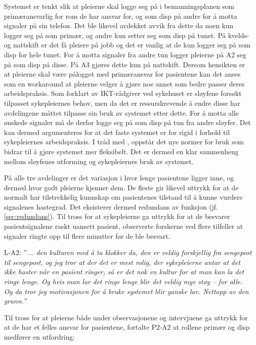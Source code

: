 \noindent
Systemet er tenkt slik at pleierne skal logge seg på i bemanningsplanen som primæransvarlig for rom de har ansvar for, og som disp på andre for å motta signaler på sin telefon. Det ble likevel avdekket avvik fra dette da noen kun logger seg på som primær, og andre kun setter seg som disp på tunet. På kvelds- og nattskift er det få pleiere på jobb og det er vanlig at de kun logger seg på som disp for hele tunet. For å motta signaler fra andre tun logger pleierne på A2 seg på som disp på disse. På A3 gjøres dette kun på nattskift. Dersom hensikten er at pleierne skal være pålogget med primæransvar for pasientene kan det anses som en workaround at pleierne velger å gjøre noe annet som bedre passer deres arbeidspraksis. Som forklart av IKT-rådgiver ved sykehuset er sløyfene forsøkt tilpasset sykepleiernes behov, men da det er ressurskrevende å endre disse har avdelingene måttet tilpasse sin bruk av systemet etter dette. For å motta alle ønskede signaler må de derfor logge seg på som disp på tun fra andre sløyfer. Det kan dermed argumenteres for at det faste systemet er for rigid i forhold til sykepleiernes arbeidspraksis. I tråd med \citep{Ackermann00}, oppstår det nye normer for bruk som bidrar til å gjøre systemet mer fleksibelt. Det er dermed en klar sammenheng mellom sløyfenes utforming og sykepleiernes bruk av systemet.

\noindent
På alle tre avdelinger er det variasjon i hvor lenge pasientene ligger inne, og dermed hvor godt pleierne kjenner dem. De fleste gir likevel uttrykk for at de normalt har tilstrekkelig kunnskap om pasientenes tilstand til å kunne vurdere signalenes hastegrad. Det eksisterer dermed redundans av funksjon (jf. \ref{sec:redundans}). Til tross for at sykepleierne ga uttrykk for at de besvarer pasientsignalene raskt uansett pasient, observerte forskerne ved flere tilfeller at signaler ringte opp til flere minutter før de ble besvart.

\noindent
L-A2: \textit{$"$... den kulturen med å ta klokker da, den er veldig forskjellig fra sengepost til sengepost, og jeg tror at der det er mest rolig, der sykepleierne antar at det ikke haster når en pasient ringer, så er det nok en kultur for at man kan la det ringe lenge. Og hvis man lar det ringe lenge blir det veldig mye støy – for alle. Og da tror jeg motivasjonen for å bruke systemet blir ganske lav. Nettopp av den grunn.$"$}

\noindent
Til tross for at pleierne både under observasjonene og intervjuene ga uttrykk for at de har et felles ansvar for pasientene, fortalte P2-A2 at rollene primær og disp medfører en utfordring:

